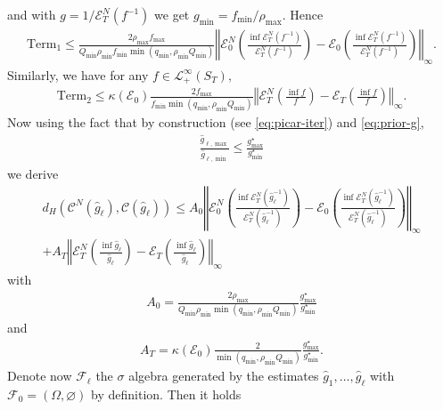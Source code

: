 \documentclass[a4paper,11pt]{amsart}
\theoremstyle{plain}
\theoremstyle{remark}
\begin{document}
and with  $g=1\big/\mathcal{E}_{T}^{N}(f^{-1})$ we get \(g_{\min}=f_{\min }/\rho_{\max}.\)
Hence 
\begin{align}
\text{Term}_{1}   \leq \frac{2\rho_{\max} f_{\max}}{ Q_{\min} \rho_{\min} f_{\min } \min(q_{\min},\rho_{\min}Q_{\min})}\left\Vert \mathcal{E}_{0}^{N}\left(\frac
{\inf\mathcal{E}_{T}^{N}(f^{-1})}{\mathcal{E}_{T}^{N}(f^{-1}%
)}\right)-\mathcal{E}_{0}\left(\frac{\inf\mathcal{E}_{T}^{N}(f^{-1})}%
{\mathcal{E}_{T}^{N}(f^{-1})}\right)\right\Vert _{\infty}.\nonumber
\end{align}
Similarly, we have  for any $f\in\mathcal{L}_{+}^{\infty}(S_{T}),$%
\begin{align}
\text{Term}_{2}  \leq \kappa (  \mathcal{E}_{0}) \frac{2f_{\max}}{ f_{\min} \min(q_{\min},\rho_{\min}Q_{\min})}\left\Vert \mathcal{E}_{T}%
^{N}\left(\frac{\inf f}{f}\right)-\mathcal{E}_{T}\left(\frac{\inf f}{f}\right)\right\Vert
_{\infty}.\nonumber
\end{align}
Now using the fact that  by construction (see \eqref{eq:picar-iter}) and \eqref{eq:prior-g},
\begin{eqnarray*}
\frac{\widehat g_{\ell,\max}}{\widehat g_{\ell,\min}}\leq \frac{g^\star_{\max}}{ g^\star_{\min}}
\end{eqnarray*}
we derive
\begin{multline*}
d_{H}(\mathcal{C}^{N}(\widehat{g}%
_{\ell}),\mathcal{C}( \widehat{g}_{\ell})  )\leq A_0\left\Vert \mathcal{E}_{0}^{N}\left(\frac
{\inf\mathcal{E}_{T}^{N}( \widehat{g}_{\ell}^{-1})}{\mathcal{E}_{T}^{N}( \widehat{g}_{\ell}^{-1}%
)}\right)-\mathcal{E}_{0}\left(\frac{\inf\mathcal{E}_{T}^{N}( \widehat{g}_{\ell}^{-1})}%
{\mathcal{E}_{T}^{N}( \widehat{g}_{\ell}^{-1})}\right)\right\Vert _{\infty}
\\
+A_T\left\Vert \mathcal{E}_{T}%
^{N}\left(\frac{\inf  \widehat{g}_{\ell}}{ \widehat{g}_{\ell}}\right)-\mathcal{E}_{T}\left(\frac{\inf  \widehat{g}_{\ell}}{ \widehat{g}_{\ell}}\right)\right\Vert
_{\infty}
\end{multline*}
with
\begin{eqnarray*}
A_0=\frac{2\rho_{\max}}{Q_{\min} \rho_{\min}  \min(q_{\min},\rho_{\min}Q_{\min})}\frac{g^\star_{\max}}{ g^\star_{\min}}
\end{eqnarray*}
and
\begin{eqnarray*}
A_T=\kappa (  \mathcal{E}_{0}) \frac{2}{ \min(q_{\min},\rho_{\min}Q_{\min})}\frac{g^\star_{\max}}{ g^\star_{\min}}.
\end{eqnarray*}
Denote now \(\mathcal{F}_{\ell}\) the \(\sigma\) algebra generated by  the estimates \(\widehat g_1,\ldots,  \widehat g_\ell\) with \(\mathcal{F}_{0}=(\Omega,\varnothing)\) by definition. Then it holds 
\end{document}
